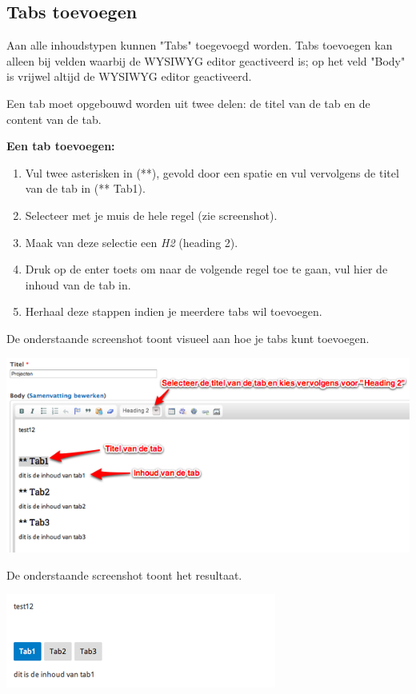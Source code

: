 \subsection{Tabs toevoegen}\label{tabstoevoegen}
Aan alle inhoudstypen kunnen "Tabs" toegevoegd worden. 
Tabs toevoegen kan alleen bij velden waarbij de WYSIWYG editor geactiveerd is; op het veld "Body" is vrijwel altijd de WYSIWYG editor geactiveerd.

Een tab moet opgebouwd worden uit twee delen: de titel van de tab en de content van de tab.

\textbf{Een tab toevoegen:} 

\begin{enumerate}
\item Vul twee asterisken in (**), gevold door een spatie en vul vervolgens de titel van de tab in (** Tab1).
\item Selecteer met je muis de hele regel (zie screenshot).
\item Maak van deze selectie een \emph{H2} (heading 2).
\item Druk op de enter toets om naar de volgende regel toe te gaan, vul hier de inhoud van de tab in.
\item Herhaal deze stappen indien je meerdere tabs wil toevoegen.
\end{enumerate}

De onderstaande screenshot toont visueel aan hoe je tabs kunt toevoegen.

\begin{center}
	\includegraphics[width=\textwidth]{img/tabs1}
\end{center}

De onderstaande screenshot toont het resultaat.

\begin{center}
	\includegraphics[width=\textwidth]{img/tabs2}
\end{center}